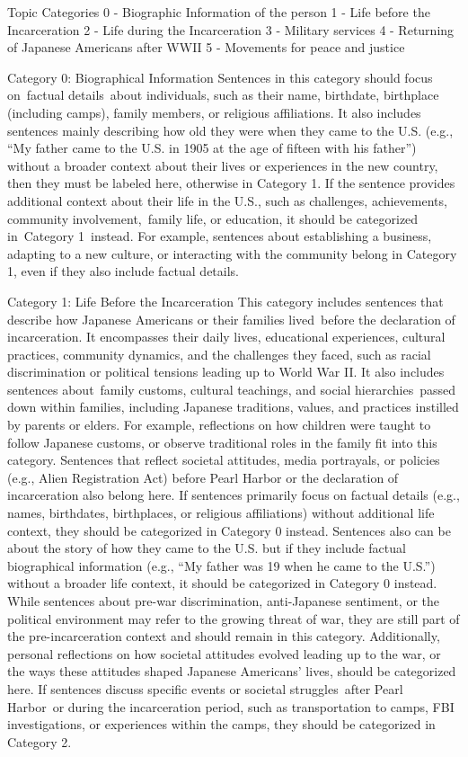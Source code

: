 Topic Categories
0 - Biographic Information of the person
1 - Life before the Incarceration 
2 - Life during the Incarceration 
3 - Military services 
4 - Returning of Japanese Americans after WWII
5 - Movements for peace and justice 

Category 0: Biographical Information
Sentences in this category should focus on factual details about individuals, such as their name, birthdate, birthplace (including camps), family members, or religious affiliations. It also includes sentences mainly describing how old they were when they came to the U.S. (e.g., “My father came to the U.S. in 1905 at the age of fifteen with his father”) without a broader context about their lives or experiences in the new country, then they must be labeled here, otherwise in Category 1. If the sentence provides additional context about their life in the U.S., such as challenges, achievements, community involvement, family life, or education, it should be categorized in Category 1 instead. For example, sentences about establishing a business, adapting to a new culture, or interacting with the community belong in Category 1, even if they also include factual details.

Category 1: Life Before the Incarceration
This category includes sentences that describe how Japanese Americans or their families lived before the declaration of incarceration. It encompasses their daily lives, educational experiences, cultural practices, community dynamics, and the challenges they faced, such as racial discrimination or political tensions leading up to World War II. It also includes sentences about family customs, cultural teachings, and social hierarchies passed down within families, including Japanese traditions, values, and practices instilled by parents or elders. For example, reflections on how children were taught to follow Japanese customs, or observe traditional roles in the family fit into this category. Sentences that reflect societal attitudes, media portrayals, or policies (e.g., Alien Registration Act) before Pearl Harbor or the declaration of incarceration also belong here. If sentences primarily focus on factual details (e.g., names, birthdates, birthplaces, or religious affiliations) without additional life context, they should be categorized in Category 0 instead.
Sentences also can be about the story of how they came to the U.S. but if they include factual biographical information (e.g., “My father was 19 when he came to the U.S.”) without a broader life context, it should be categorized in Category 0 instead.
While sentences about pre-war discrimination, anti-Japanese sentiment, or the political environment may refer to the growing threat of war, they are still part of the pre-incarceration context and should remain in this category. Additionally, personal reflections on how societal attitudes evolved leading up to the war, or the ways these attitudes shaped Japanese Americans' lives, should be categorized here.
If sentences discuss specific events or societal struggles after Pearl Harbor or during the incarceration period, such as transportation to camps, FBI investigations, or experiences within the camps, they should be categorized in Category 2.

